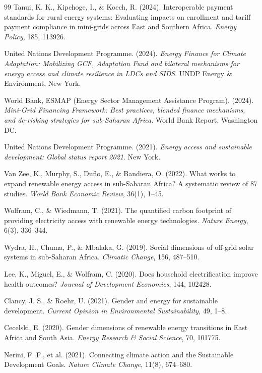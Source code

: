 \documentclass[12pt, a4paper]{article}
\begin{document}
\begin{thebibliography}{99}
 Tanui, K. K., Kipchoge, I., \& Koech, R. (2024). Interoperable payment standards for rural energy systems: Evaluating impacts on enrollment and tariff payment compliance in mini-grids across East and Southern Africa. \textit{Energy Policy}, 185, 113926.

 United Nations Development Programme. (2024). \textit{Energy Finance for Climate Adaptation: Mobilizing GCF, Adaptation Fund and bilateral mechanisms for energy access and climate resilience in LDCs and SIDS}. UNDP Energy \& Environment, New York.

 World Bank, ESMAP (Energy Sector Management Assistance Program). (2024). \textit{Mini-Grid Financing Framework: Best practices, blended finance mechanisms, and de-risking strategies for sub-Saharan Africa}. World Bank Report, Washington DC.

 United Nations Development Programme. (2021). \textit{Energy access and sustainable development: Global status report 2021}. New York.

 Van Zee, K., Murphy, S., Duflo, E., \& Bandiera, O. (2022). What works to expand renewable energy access in sub-Saharan Africa? A systematic review of 87 studies. \textit{World Bank Economic Review}, 36(1), 1--45.

 Wolfram, C., \& Wiedmann, T. (2021). The quantified carbon footprint of providing electricity access with renewable energy technologies. \textit{Nature Energy}, 6(3), 336--344.

 Wydra, H., Chuma, P., \& Mbalaka, G. (2019). Social dimensions of off-grid solar systems in sub-Saharan Africa. \textit{Climatic Change}, 156, 487--510.

 Lee, K., Miguel, E., \& Wolfram, C. (2020). Does household electrification improve health outcomes? \textit{Journal of Development Economics}, 144, 102428.

 Clancy, J. S., \& Roehr, U. (2021). Gender and energy for sustainable development. \textit{Current Opinion in Environmental Sustainability}, 49, 1--8.

 Cecelski, E. (2020). Gender dimensions of renewable energy transitions in East Africa and South Asia. \textit{Energy Research \& Social Science}, 70, 101775.

 Nerini, F. F., et al. (2021). Connecting climate action and the Sustainable Development Goals. \textit{Nature Climate Change}, 11(8), 674--680.


\end{thebibliography}
\end{document}
